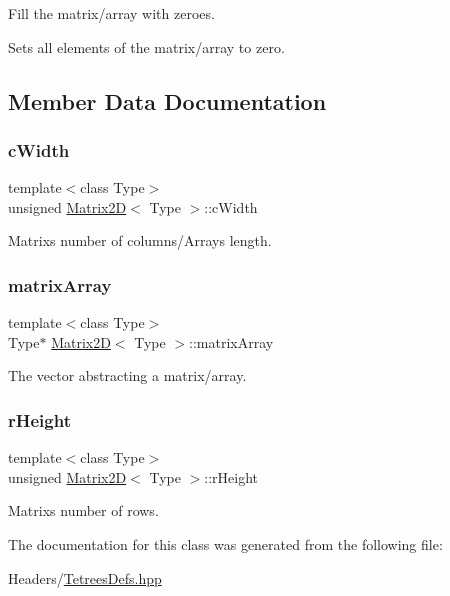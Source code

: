 Fill the matrix/array with zeroes. 

Sets all elements of the matrix/array to zero. 

\subsection{Member Data Documentation}
\mbox{\label{classMatrix2D_ad30f0f3c259aaa26ddda2b4d17eddef2}} 
\subsubsection{\texorpdfstring{c\+Width}{cWidth}}
{\footnotesize\ttfamily template$<$class Type$>$ \\
unsigned \mbox{\hyperlink{classMatrix2D}{Matrix2D}}$<$ Type $>$\+::c\+Width\hspace{0.3cm}{\ttfamily [private]}}

Matrix\textquotesingle{}s number of columns/\+Array\textquotesingle{}s length. \mbox{\label{classMatrix2D_a6e702a96baba89ad29226ceb44676e2b}} 
\subsubsection{\texorpdfstring{matrix\+Array}{matrixArray}}
{\footnotesize\ttfamily template$<$class Type$>$ \\
Type$\ast$ \mbox{\hyperlink{classMatrix2D}{Matrix2D}}$<$ Type $>$\+::matrix\+Array\hspace{0.3cm}{\ttfamily [private]}}

The vector abstracting a matrix/array. \mbox{\label{classMatrix2D_afdcd47964719a1c4e006fbdd313d2f17}} 
\subsubsection{\texorpdfstring{r\+Height}{rHeight}}
{\footnotesize\ttfamily template$<$class Type$>$ \\
unsigned \mbox{\hyperlink{classMatrix2D}{Matrix2D}}$<$ Type $>$\+::r\+Height\hspace{0.3cm}{\ttfamily [private]}}

Matrix\textquotesingle{}s number of rows. 

The documentation for this class was generated from the following file\+:\begin{DoxyCompactItemize}
\item 
Headers/\mbox{\hyperlink{TetreesDefs_8hpp}{Tetrees\+Defs.\+hpp}}\end{DoxyCompactItemize}
